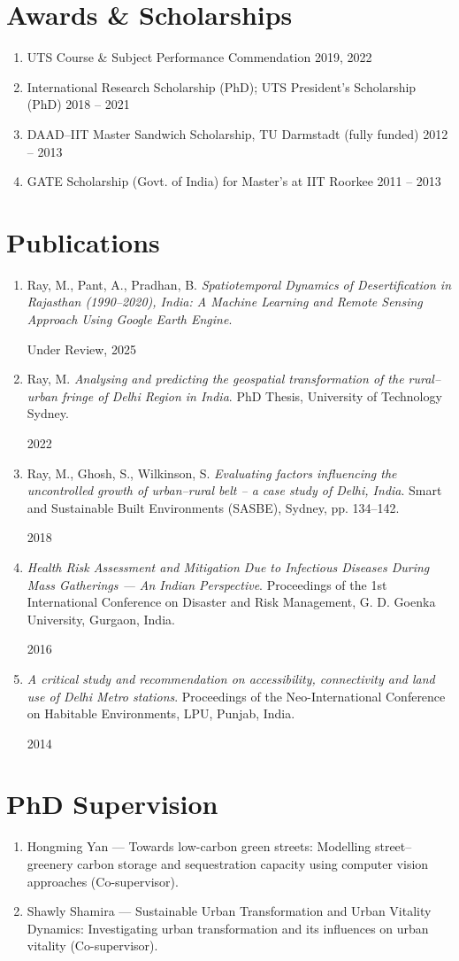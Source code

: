 \documentclass[a4paper,11pt]{article}
\newcommand{\resumeProjectHeading}[2]{%
  \item \small #1 \hfill #2 \vspace{-7pt}%
}
\newcommand{\resumePublicationHeading}[2]{%
  \item \begin{minipage}[t]{0.78\textwidth}
    \small #1
  \end{minipage}%
  \hfill%
  \begin{minipage}[t]{0.18\textwidth}
    \raggedleft\small #2
  \end{minipage}\vspace{-7pt}%
}
\newcommand{\resumeSubHeadingListStart}{\begin{enumerate}[leftmargin=0.15in]}
\newcommand{\resumeSubHeadingListEnd}{\end{enumerate}}
\begin{document}
\section{Awards \& Scholarships}
  \resumeSubHeadingListStart
    \resumeProjectHeading{UTS Course \& Subject Performance Commendation}{2019, 2022}
    \resumeProjectHeading{International Research Scholarship (PhD); UTS President's Scholarship (PhD)}{2018 -- 2021}
    \resumeProjectHeading{DAAD–IIT Master Sandwich Scholarship, TU Darmstadt (fully funded)}{2012 -- 2013}
    \resumeProjectHeading{GATE Scholarship (Govt. of India) for Master's at IIT Roorkee}{2011 -- 2013}
  \resumeSubHeadingListEnd

\section{Publications}
  \resumeSubHeadingListStart
    \resumePublicationHeading{Ray, M., Pant, A., Pradhan, B. \emph{Spatiotemporal Dynamics of Desertification in Rajasthan (1990–2020), India: A Machine Learning and Remote Sensing Approach Using Google Earth Engine}.}{Under Review, 2025}
    \resumePublicationHeading{Ray, M. \emph{Analysing and predicting the geospatial transformation of the rural–urban fringe of Delhi Region in India}. PhD Thesis, University of Technology Sydney.}{2022}
    \resumePublicationHeading{Ray, M., Ghosh, S., Wilkinson, S. \emph{Evaluating factors influencing the uncontrolled growth of urban–rural belt – a case study of Delhi, India}. Smart and Sustainable Built Environments (SASBE), Sydney, pp. 134–142.}{2018}
    \resumePublicationHeading{\emph{Health Risk Assessment and Mitigation Due to Infectious Diseases During Mass Gatherings — An Indian Perspective}. Proceedings of the 1st International Conference on Disaster and Risk Management, G. D. Goenka University, Gurgaon, India.}{2016}
    \resumePublicationHeading{\emph{A critical study and recommendation on accessibility, connectivity and land use of Delhi Metro stations}. Proceedings of the Neo-International Conference on Habitable Environments, LPU, Punjab, India.}{2014}
  \resumeSubHeadingListEnd

\section{PhD Supervision}

\begin{enumerate}
    \item Hongming Yan — Towards low-carbon green streets: Modelling street–greenery carbon storage and sequestration capacity using computer vision approaches (Co-supervisor).
    \item Shawly Shamira — Sustainable Urban Transformation and Urban Vitality Dynamics: Investigating urban transformation and its influences on urban vitality (Co-supervisor).
\end{enumerate}
\end{document}
